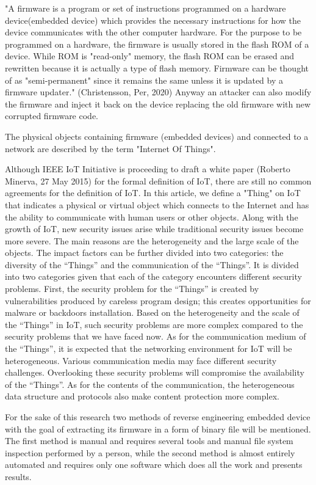 \documentclass[]{report}
\begin{document}
"A firmware is a program or set of instructions programmed on a hardware device(embedded device) which provides the necessary instructions for how the device communicates with the other computer hardware. For the purpose to be programmed on a hardware, the firmware is usually stored in the flash ROM of a device. While ROM is "read-only" memory, the flash ROM can be erased and rewritten because it is actually a type of flash memory. Firmware can be thought of as "semi-permanent" since it remains the same unless it is updated by a firmware updater." (Christensson, Per, 2020) Anyway an attacker can also modify the firmware and inject it back on the device replacing the old firmware with new corrupted firmware code.

The physical objects containing firmware (embedded devices) and connected to a network are described by the term "Internet Of Things".

Although IEEE IoT Initiative is proceeding to draft a white
paper (Roberto Minerva, 27 May 2015) for the formal definition of IoT, there are still no
common agreements for the definition of IoT. In this article,
we define a "Thing" on IoT that indicates a physical or
virtual object which connects to the Internet and has the
ability to communicate with human users or other objects.
Along with the growth of IoT, new security issues arise
while traditional security issues become more severe. The
main reasons are the heterogeneity and the large scale of the
objects. The impact factors can be further divided into two
categories: the diversity of the “Things” and the
communication of the “Things”. It is divided into two
categories given that each of the category encounters
different security problems.
First, the security problem for the “Things” is created by
vulnerabilities produced by careless program design; this
creates opportunities for malware or backdoors installation.
Based on the heterogeneity and the scale of the “Things” in
IoT, such security problems are more complex compared to
the security problems that we have faced now.
As for the communication medium of the “Things”, it is
expected that the networking environment for IoT will be
heterogeneous. Various communication media may face
different security challenges. Overlooking these security
problems will compromise the availability of the “Things”.
As for the contents of the communication, the heterogeneous
data structure and protocols also make content protection more complex.

For the sake of this research two methods of reverse engineering embedded device with the goal of extracting its firmware in a form of binary file will be mentioned. The first method is manual and requires several tools and manual file system inspection performed by a person, while the second method is almost entirely automated and requires only one software which does all the work and presents results.
\end{document}
